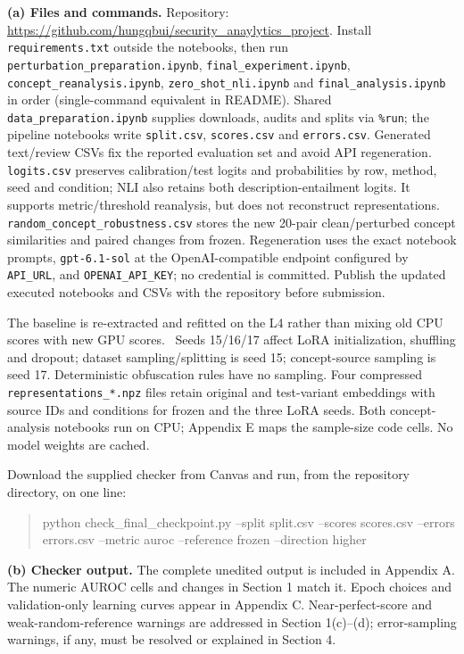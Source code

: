 \documentclass[10pt]{article}
\makeatletter
\renewcommand\section{\@startsection{section}{1}{0pt}{1.2ex plus .5ex minus .2ex}{.6ex plus .2ex}{\normalfont\large\bfseries}}
\newcommand{\code}[1]{\nolinkurl{#1}}
\makeatother
\begin{document}
\newpage
\section{Reproducibility}
\textbf{(a) Files and commands.} Repository: \url{https://github.com/hungqbui/security_anaylytics_project}. Install \code{requirements.txt} outside the notebooks, then run \code{perturbation\_preparation.ipynb}, \code{final\_experiment.ipynb}, \code{concept\_reanalysis.ipynb}, \code{zero\_shot\_nli.ipynb} and \code{final\_analysis.ipynb} in order (single-command equivalent in README). Shared \code{data\_preparation.ipynb} supplies downloads, audits and splits via \texttt{\%run}; the pipeline notebooks write \code{split.csv}, \code{scores.csv} and \code{errors.csv}. Generated text/review CSVs fix the reported evaluation set and avoid API regeneration. \code{logits.csv} preserves calibration/test logits and probabilities by row, method, seed and condition; NLI also retains both description-entailment logits. It supports metric/threshold reanalysis, but does not reconstruct representations. \code{random\_concept\_robustness.csv} stores the new 20-pair clean/perturbed concept similarities and paired changes from frozen. Regeneration uses the exact notebook prompts, \code{gpt-6.1-sol} at the OpenAI-compatible endpoint configured by \code{API\_URL}, and \code{OPENAI\_API\_KEY}; no credential is committed. Publish the updated executed notebooks and CSVs with the repository before submission.

The baseline is re-extracted and refitted on the L4 rather than mixing old CPU scores with new GPU scores. \BaselineReproduction\ Seeds 15/16/17 affect LoRA initialization, shuffling and dropout; dataset sampling/splitting is seed 15; concept-source sampling is seed 17. Deterministic obfuscation rules have no sampling. Four compressed \code{representations\_*.npz} files retain original and test-variant embeddings with source IDs and conditions for frozen and the three LoRA seeds. Both concept-analysis notebooks run on CPU; Appendix E maps the sample-size code cells. No model weights are cached. \TruncationDescription

Download the supplied checker from Canvas and run, from the repository directory, on one line:
\begin{quote}\small\ttfamily
python check\_final\_checkpoint.py --split split.csv --scores scores.csv --errors errors.csv --metric auroc --reference frozen --direction higher
\end{quote}
\textbf{(b) Checker output.} The complete unedited output is included in Appendix A. The numeric AUROC cells and changes in Section 1 match it. Epoch choices and validation-only learning curves appear in Appendix C. Near-perfect-score and weak-random-reference warnings are addressed in Section 1(c)--(d); error-sampling warnings, if any, must be resolved or explained in Section 4.
\end{document}
